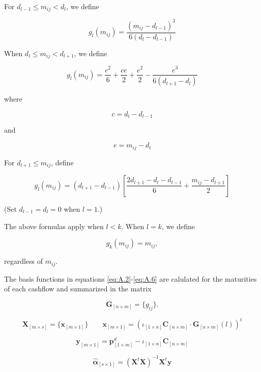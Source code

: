 For $d_{l-1}\leq m_{ij} <d_l$, we define

\begin{equation}
  \label{eq:A.3}
  g_l(m_{ij})=\frac{(m_{ij}-d_{l-1})^3}{6(d_l-d_{l-1})}
\end{equation}

When $d_l\leq m_{ij}< d_{l+1}$, we define

\begin{equation}
  \label{eq:A.4a}
  g_l(m_{ij}) = \frac{c^2}{6}+\frac{ce}{2}+\frac{e^2}{2}-\frac{e^3}{6(d_{l+1}-d_l)}
\end{equation}

where

\begin{equation}
  \label{eq:A.4b}
  c = d_l-d_{l-1}
\end{equation}

and 

\begin{equation}
  \label{eq:A.4c}
  e = m_{ij}-d_l
\end{equation}

For $d_{l+1}\leq m_{ij}$, define

\begin{equation}
  \label{eq:A.5}
  g_l(m_{ij}) = (d_{l+1}-d_{l-1})\left[\frac{2d_{l+1}-d_l-d_{l-1}}{6}+\frac{m_{ij}-d_{l+1}}{2}\right]
\end{equation}

(Set $d_{l-1}=d_l=0$ when $l=1$.)

The above formulas apply when $l<k$. When $l=k$, we define

\begin{equation}
  \label{eq:A.6}
 g _k(m_{ij}) = m_{ij},
\end{equation}

regardless of $m_{ij}$.

The basis functions in equations \eqref{eq:A.2}-\eqref{eq:A.6} are calulated for the maturities of each cashflow and summarized in the matrix

\begin{equation}
\label{eq:basisfctmatrix}	
\bm{G}_{\left [n \times m\right]} = \{g_{ij}\}.
\end{equation}

	

	$$\bm{X}_{\left[m \times s\right]}=\{ \bm{x}_{\left[m \times 1\right]} \} \qquad  \bm{x}_{\left[m \times 1\right]} = \left( \iota_{\left[1\times n\right]} \bm{C}_{\left[n\times m\right]} \cdot \bm{G}_{\left[n\times m\right]}(l) \right)^t$$

	

	$$\bm{y}_{\left[m \times 1\right]}=  \bm{p}^d_{\left[1\times m\right]}  - \iota_{\left[1\times n\right]} \bm{C}_{\left[n\times m\right]}   $$

	

	$$\bm{\hat \alpha}_{\left[s \times 1\right]}= \left( \bm{X}^t   \bm{X}\right )^{-1}\bm{X}^t \bm{y}$$



